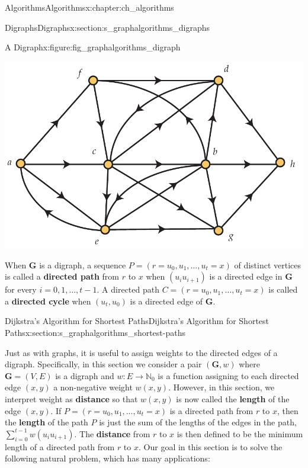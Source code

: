 \documentclass[oneside,10pt,]{book}
\newcommand{\terminology}[1]{\textbf{#1}}
\numberwithin{equation}{section}
\newcommand{\nonnegints}{\mathbb{N}_0}
\newcommand{\GVE}{\mathbf{G}=(V,E)}
\newcommand{\bfG}{\mathbf{G}}
\begin{document}
\begin{chapterptx}{Algorithms}{}{Algorithms}{}{}{x:chapter:ch_algorithms}
\begin{sectionptx}{Digraphs}{}{Digraphs}{}{}{x:section:s_graphalgorithms_digraphs}
\begin{figureptx}{A Digraph}{x:figure:fig_graphalgorithms_digraph}{}
\begin{image}{0.075}{0.85}{0.075}
\includegraphics[width=\linewidth]{images/digraph}
\end{image}%
\tcblower
\end{figureptx}%
When \(\bfG\) is a digraph, a sequence \(P=(r=u_0,u_1,\dots,u_t=x)\) of distinct vertices is called a \terminology{directed path} from \(r\) to \(x\) when \((u_iu_{i+1})\) is a directed edge in \(\bfG\) for every \(i=0,1,\dots,t-1\). A directed path \(C=(r=u_0,u_1,\dots,u_t=x)\) is called a \terminology{directed cycle} when \((u_t,u_0)\) is a directed edge of \(\bfG\).%
\end{sectionptx}
%
%
\typeout{************************************************}
\typeout{************************************************}
%
\begin{sectionptx}{Dijkstra's Algorithm for Shortest Paths}{}{Dijkstra's Algorithm for Shortest Paths}{}{}{x:section:s_graphalgorithms_shortest-paths}
\begin{introduction}{}%
Just as with graphs, it is useful to assign weights to the directed edges of a digraph. Specifically, in this section we consider a pair \((\bfG,w)\) where \(\GVE\) is a digraph and \(w\colon E\rightarrow\nonnegints\) is a function assigning to each directed edge \((x,y)\) a non-negative weight \(w(x,y)\). However, in this section, we interpret weight as \terminology{distance} so that \(w(x,y)\) is now called the \terminology{length} of the edge \((x,y)\). If \(P=(r=u_0,u_1,\dots,u_t=x)\) is a directed path from \(r\) to \(x\), then the \terminology{length} of the path \(P\) is just the sum of the lengths of the edges in the path, \(\sum_{i=0}^{t-1} w(u_iu_{i+1})\). The \terminology{distance} from \(r\) to \(x\) is then defined to be the minimum length of a directed path from \(r\) to \(x\). Our goal in this section is to solve the following natural problem, which has many applications:%

\end{introduction}
\end{sectionptx}
\end{chapterptx}
\end{document}
